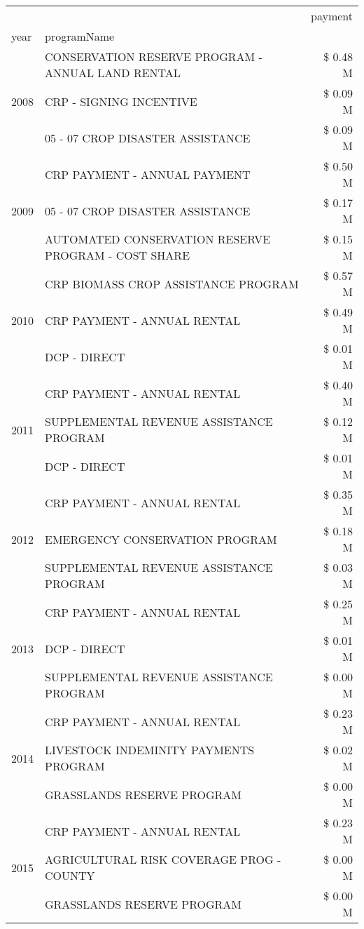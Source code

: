 \begin{tabular}{llr}
\toprule
 &  & payment \\
year & programName &  \\
\midrule
\multirow[t]{3}{*}{2008} & CONSERVATION RESERVE PROGRAM - ANNUAL LAND RENTAL & \$ 0.48 M \\
 & CRP - SIGNING INCENTIVE & \$ 0.09 M \\
 & 05 - 07 CROP DISASTER ASSISTANCE & \$ 0.09 M \\
\cline{1-3}
\multirow[t]{3}{*}{2009} & CRP PAYMENT - ANNUAL PAYMENT & \$ 0.50 M \\
 & 05 - 07 CROP DISASTER ASSISTANCE & \$ 0.17 M \\
 & AUTOMATED CONSERVATION RESERVE PROGRAM - COST SHARE & \$ 0.15 M \\
\cline{1-3}
\multirow[t]{3}{*}{2010} & CRP BIOMASS CROP ASSISTANCE PROGRAM & \$ 0.57 M \\
 & CRP PAYMENT - ANNUAL RENTAL & \$ 0.49 M \\
 & DCP - DIRECT & \$ 0.01 M \\
\cline{1-3}
\multirow[t]{3}{*}{2011} & CRP PAYMENT - ANNUAL RENTAL & \$ 0.40 M \\
 & SUPPLEMENTAL REVENUE ASSISTANCE PROGRAM & \$ 0.12 M \\
 & DCP - DIRECT & \$ 0.01 M \\
\cline{1-3}
\multirow[t]{3}{*}{2012} & CRP PAYMENT - ANNUAL RENTAL & \$ 0.35 M \\
 & EMERGENCY CONSERVATION PROGRAM & \$ 0.18 M \\
 & SUPPLEMENTAL REVENUE ASSISTANCE PROGRAM & \$ 0.03 M \\
\cline{1-3}
\multirow[t]{3}{*}{2013} & CRP PAYMENT - ANNUAL RENTAL & \$ 0.25 M \\
 & DCP - DIRECT & \$ 0.01 M \\
 & SUPPLEMENTAL REVENUE ASSISTANCE PROGRAM & \$ 0.00 M \\
\cline{1-3}
\multirow[t]{3}{*}{2014} & CRP PAYMENT - ANNUAL RENTAL & \$ 0.23 M \\
 & LIVESTOCK INDEMINITY PAYMENTS PROGRAM & \$ 0.02 M \\
 & GRASSLANDS RESERVE PROGRAM & \$ 0.00 M \\
\cline{1-3}
\multirow[t]{3}{*}{2015} & CRP PAYMENT - ANNUAL RENTAL & \$ 0.23 M \\
 & AGRICULTURAL RISK COVERAGE PROG - COUNTY & \$ 0.00 M \\
 & GRASSLANDS RESERVE PROGRAM & \$ 0.00 M \\

\end{tabular}
